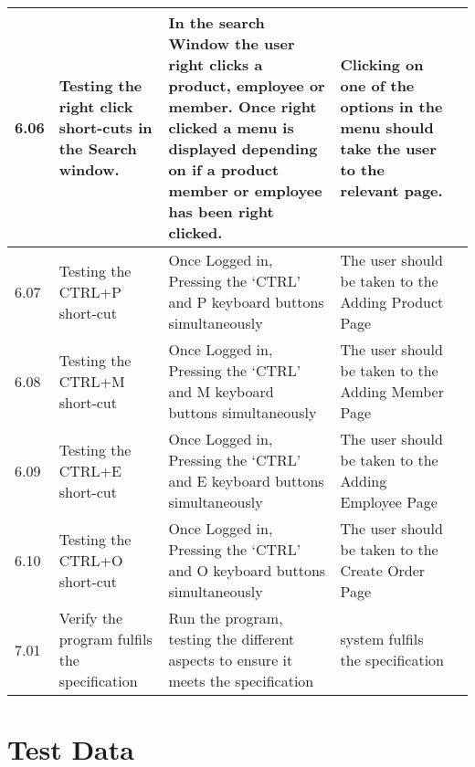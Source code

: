 \begin{flushleft}
\begin{longtable}{|p{1cm}|p{2.5cm}|p{2.5cm}|p{2cm}|p{2cm}|}
	\rowcolor{light-grey} 6.06 & Testing the right click short-cuts in the Search window. & In the search Window the user right clicks a product, employee or member. Once right clicked a menu is displayed depending on if a product member or employee has been right clicked. & Clicking on one of the options in the menu should take the user to the relevant page.& \\ \hline
	\rowcolor{light-grey} 6.07 & Testing the CTRL+P short-cut & Once Logged in, Pressing the `CTRL' and P keyboard buttons simultaneously & The user should be taken to the Adding Product Page& \\ \hline
	\rowcolor{light-grey} 6.08 & Testing the CTRL+M short-cut & Once Logged in, Pressing the `CTRL' and M keyboard buttons simultaneously & The user should be taken to the Adding Member Page& \\ \hline
	\rowcolor{light-grey} 6.09 & Testing the CTRL+E short-cut & Once Logged in, Pressing the `CTRL' and E keyboard buttons simultaneously & The user should be taken to the Adding Employee Page& \\ \hline
	\rowcolor{light-grey} 6.10 & Testing the CTRL+O short-cut & Once Logged in, Pressing the `CTRL' and O keyboard buttons simultaneously & The user should be taken to the Create Order Page& \\ \hline
	7.01 & Verify the program fulfils the specification & Run the program, testing the different aspects to ensure it meets the specification  & system fulfils the specification & \\ \hline
\end{longtable}
\end{flushleft}

\pagebreak

\section{Test Data}

